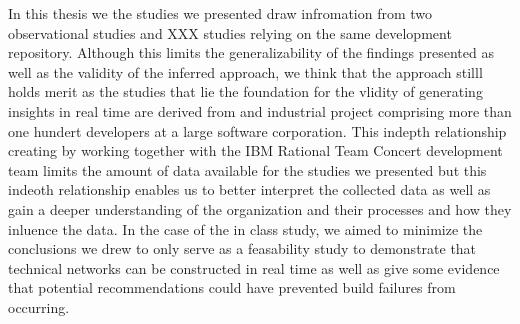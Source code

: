 In this thesis we the studies we presented draw infromation from two observational studies and XXX studies relying on the same development repository.
Although this limits the generalizability of the findings presented as well as the validity of the inferred approach, we think that the approach stilll holds merit as the studies that lie the foundation for the vlidity of generating insights in real time are derived from and industrial project comprising more than one hundert developers at a large software corporation.
This indepth relationship creating by working together with the IBM Rational Team Concert development team limits the amount of data available for the studies we presented but this indeoth relationship enables us to better interpret the collected data as well as gain a deeper understanding of the organization and their processes and how they inluence the data.
In the case of the in class study, we aimed to minimize the conclusions we drew to only serve as a feasability study to demonstrate that technical networks can be constructed in real time as well as give some evidence that potential recommendations could have prevented build failures from occurring.


